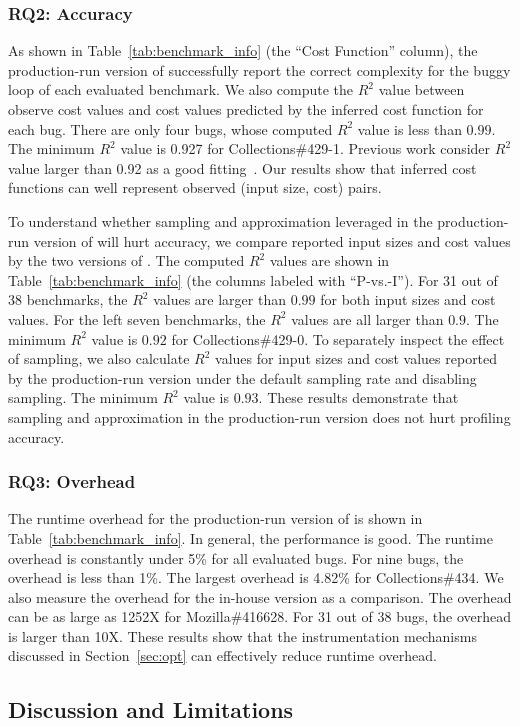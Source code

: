 \subsubsection{RQ2: Accuracy}
As shown in Table~\ref{tab:benchmark_info} (the ``Cost Function'' column),
the production-run version of \Tool successfully 
report the correct complexity for the buggy loop of 
each evaluated benchmark. 
We also compute the $R^2$ value between observe cost values and 
cost values predicted by the inferred cost function for each bug.  
There are only four bugs, whose computed $R^2$ value is less than $0.99$.
The minimum $R^2$ value is 0.927 for Collections\#429-1. 
Previous work consider $R^2$ value larger than 0.92 
as a good fitting~\cite{rsquare-value}.
Our results show that inferred cost functions can well represent 
observed (input size, cost) pairs. 
%

To understand whether sampling and approximation leveraged 
in the production-run version of \Tool will hurt accuracy, 
we compare reported input sizes and cost values by the two versions of \Tool.
The computed $R^2$ values are shown in Table~\ref{tab:benchmark_info} 
(the columns labeled with ``P-vs.-I''). 
For 31 out of 38 benchmarks, 
the $R^2$ values are larger than $0.99$ for both input sizes and cost values. 
For the left seven benchmarks, the $R^2$ values are all larger than $0.9$.
The minimum $R^2$ value is $0.92$ for Collections\#429-0. 
To separately inspect the effect of sampling, 
we also calculate $R^2$ values for input sizes and cost values reported 
by the production-run version under the default sampling rate and disabling sampling. 
The minimum $R^2$ value is $0.93$. 
These results demonstrate that sampling and approximation in the production-run 
version does not hurt profiling accuracy. 


\subsubsection{RQ3: Overhead}
The runtime overhead for the production-run version of \Tool is 
shown in Table~\ref{tab:benchmark_info}. 
In general, the performance is good. The runtime overhead is constantly 
under 5\% for all evaluated bugs. 
For nine bugs, the overhead is less than 1\%. 
The largest overhead is 4.82\% for Collections\#434. 
We also measure the overhead for the in-house version as a comparison. 
The overhead can be as large as 1252X for Mozilla\#416628.
For 31 out of 38 bugs, the overhead is larger than 10X. 
These results show that the instrumentation mechanisms 
discussed in Section~\ref{sec:opt} can effectively reduce runtime overhead. 



\subsection{Discussion and Limitations}


